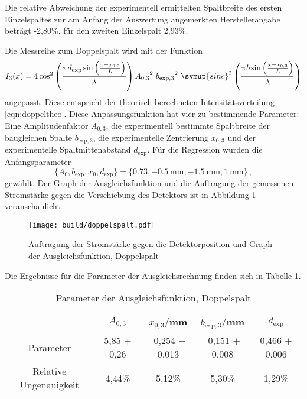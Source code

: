 Die relative Abweichung der experimentell ermittelten Spaltbreite des ersten Einzelspaltes zur am Anfang der
Auswertung angemerkten Herstellerangabe beträgt -2,80\%, für den zweiten Einzelspalt 2,93\%.

Die Messreihe zum Doppelspalt wird mit der Funktion
\begin{equation*}
  I_3 (x) = 4 \cos^2\left(\frac{\pi d_\text{exp} \sin\left(\frac{x-x_{0,3}}{L}\right)}{\lambda}\right) {A_{0,3}}^2 \,\, {b_{\text{exp},3}}^2 \,\,
  \symup{sinc}^2\left(\frac{\pi b \sin\left(\frac{x-x_{0,3}}{L}\right)}{\lambda}\right)
\end{equation*}
angepasst. Diese entspricht der theorisch berechneten Intensitätsverteilung \eqref{eqn:doppeltheo}.
Diese Anpassungsfunktion hat vier zu bestimmende Parameter: Eine Amplitudenfaktor $A_{0,3}$,
die experimentell bestimmte Spaltbreite der baugleichen Spalte $b_{\text{exp},3}$,
die experimentelle Zentrierung $x_{0,3}$ und der experimentelle Spaltmittenabstand
$d_\text{exp}$.
Für die Regression wurden die Anfangsparameter
\begin{equation*}
  \{A_0, b_{\text{exp}}, x_0, d_\text{exp}\} = \{0.73, \SI{-0.5}{\milli\meter}, \SI{-1.5}{\milli\meter}, \SI{1}{\milli\meter}\}\,,
\end{equation*}
gewählt.
Der Graph der Ausgleichsfunktion und die Auftragung der gemessenen Stromstärke gegen
die Verschiebung des Detektors ist in Abbildung \ref{fig:spalt3} veranschaulicht.

\begin{figure}
  \centering
  \texttt{[image: build/doppelspalt.pdf]}
  \caption{Auftragung der Stromstärke gegen die Detektorposition und Graph der Ausgleichsfunktion, Doppelspalt}
  \label{fig:spalt3}
\end{figure}

Die Ergebnisse für die Parameter der Ausgleichsrechnung finden sich in Tabelle \ref{tab:paramsdoppel}.

\begin{table}
\centering
\begin{tabular}{ccccc}
\toprule
& $A_{0,3}$ & $x_{0,3}/$mm & $b_{\text{exp},3}/$mm & $d_\text{exp}$ \\
\midrule
Parameter & 5,85 $\pm$ 0,26 & -0,254 $\pm$ 0,013 & -0,151 $\pm$ 0,008 & 0,466 $\pm$ 0,006 \\
Relative Ungenauigkeit & 4,44\% & 5,12\% & 5,30\% & 1,29\%\\
\bottomrule
\end{tabular}
\caption{Parameter der Ausgleichsfunktion, Doppelspalt}
\label{tab:paramsdoppel}
\end{table}

